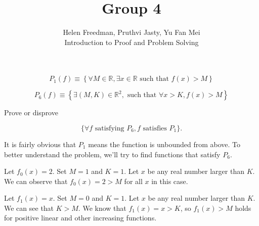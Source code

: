 \documentclass[12pt]{article}
\newenvironment{problem}[2][Problem]{\begin{trivlist}
\item[\hskip \labelsep {\bfseries #1}\hskip \labelsep {\bfseries #2.}]}{\end{trivlist}}
\newenvironment{example}[2][Example]{\begin{trivlist}
\item[\hskip \labelsep {\bfseries #1}\hskip \labelsep {\bfseries #2.}]}{\end{trivlist}}
\begin{document}

\title{Group 4}%
\author{Helen Freedman, Pruthvi Jasty, Yu Fan Mei\\ %
	Introduction to Proof and Problem Solving} %
\maketitle

\begin{problem}{4a} %

    $$P_1 (f) \equiv \left\{ \forall M \in \mathbb{R}, \exists x \in \mathbb{R} \text{ such that } f(x) > M \right\}$$

    $$P_6 (f) \equiv \left\{ \exists (M, K) \in \mathbb{R}^2, \text{ such that } \forall x > K, f(x) > M \right\}$$

    Prove or disprove

    $$ \{ \forall f \text{ satisfying } P_6, f \text{ satisfies } P_1 \}. $$

\end{problem}

\begin{example}{1} It is fairly obvious that $P_1$ means the function is unbounded from above. To better understand the problem, we'll try to find functions that satisfy $P_6$.



    Let $f_0(x) = 2$. Set $M = 1$ and $K = 1$. Let $x$ be any real number larger than $K$. We can observe that $f_0(x) = 2 > M$ for all $x$ in this case.

    Let $f_1(x) = x$. Set $M = 0$ and $K = 1$. Let $x$ be any real number larger than $K$. We can see that $K > M$. We know that $f_1(x) = x > K$, so $f_1(x) > M$ holds for positive linear and other increasing functions.




\end{example}
\end{document}
